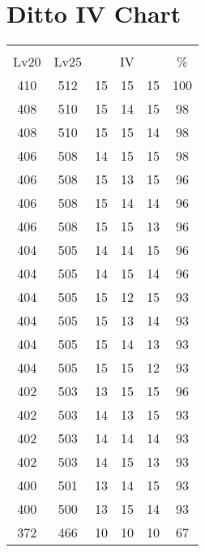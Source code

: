 \documentclass{article}%
\begin{document}
%
\normalsize%
\section{Ditto IV Chart}%
\label{sec:Ditto IV Chart}%
\renewcommand{\arraystretch}{1.5}%
\begin{tabular}{|c|c|c|c|c|c|}%
\hline%
\multicolumn{6}{|c|}{\textcolor{white}{ 
\linebreak{Ditto}
}%
\cellcolor{black}}\\%
\multicolumn{1}{|c}{Lv20}&\multicolumn{1}{c|}{Lv25}&\multicolumn{3}{c|}{IV}&\multicolumn{1}{|c|}{\%}\\%
\hline%
\rowcolor{color100}%
410&512&15&15&15&100\\%
\hline%
\rowcolor{color98}%
408&510&15&14&15&98\\%
\hline%
\rowcolor{color98}%
408&510&15&15&14&98\\%
\hline%
\rowcolor{color98}%
406&508&14&15&15&98\\%
\hline%
\rowcolor{color96}%
406&508&15&13&15&96\\%
\hline%
\rowcolor{color96}%
406&508&15&14&14&96\\%
\hline%
\rowcolor{color96}%
406&508&15&15&13&96\\%
\hline%
\rowcolor{color96}%
404&505&14&14&15&96\\%
\hline%
\rowcolor{color96}%
404&505&14&15&14&96\\%
\hline%
\rowcolor{color93}%
404&505&15&12&15&93\\%
\hline%
\rowcolor{color93}%
404&505&15&13&14&93\\%
\hline%
\rowcolor{color93}%
404&505&15&14&13&93\\%
\hline%
\rowcolor{color93}%
404&505&15&15&12&93\\%
\hline%
\rowcolor{color96}%
402&503&13&15&15&96\\%
\hline%
\rowcolor{color93}%
402&503&14&13&15&93\\%
\hline%
\rowcolor{color93}%
402&503&14&14&14&93\\%
\hline%
\rowcolor{color93}%
402&503&14&15&13&93\\%
\hline%
\rowcolor{color93}%
400&501&13&14&15&93\\%
\hline%
\rowcolor{color93}%
400&500&13&15&14&93\\%
\hline%
\rowcolor{color91}%
372&466&10&10&10&67\\%
\end{tabular}

%
\end{document}
